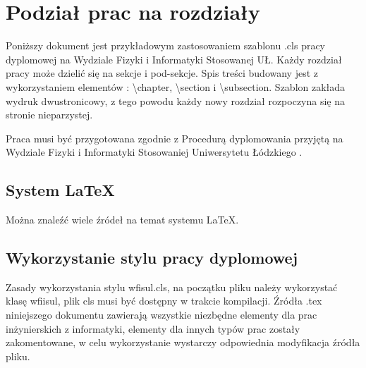 \documentclass{wfiisul}
\begin{document}

\nralbumu{****}

\promotor{***}
\katedra{****}


\specjalizacja{****}






\stronatytulowa


\chapter{Podział prac na rozdziały}

Poniższy dokument jest przykładowym zastosowaniem szablonu .cls pracy dyplomowej na Wydziale Fizyki i Informatyki Stosowanej UŁ. Każdy rozdział pracy może dzielić się na sekcje i pod-sekcje. Spis treści budowany jest z wykorzystaniem elementów : {\textbackslash}chapter, {\textbackslash}section i {\textbackslash}subsection. Szablon zakłada wydruk dwustronicowy, z tego powodu każdy nowy rozdział rozpoczyna się na stronie nieparzystej.

Praca musi być przygotowana zgodnie z Procedurą dyplomowania przyjętą na Wydziale Fizyki i Informatyki Stosowaniej Uniwersytetu Łódzkiego \cite{Procedura_dyplomowania}.
\section{System \LaTeX}
Można znaleźć wiele źródeł na temat systemu \LaTeX \cite{latex_wiki}.

\section{Wykorzystanie stylu pracy dyplomowej}
Zasady wykorzystania stylu wfisul.cls, na początku pliku należy wykorzystać klasę wfiisul, plik cls musi być dostępny w trakcie kompilacji. Źródła .tex niniejszego dokumentu zawierają wszystkie niezbędne elementy dla prac inżynierskich z informatyki, elementy dla innych typów prac zostały zakomentowane, w celu wykorzystanie wystarczy odpowiednia modyfikacja źródła pliku. 
\end{document}
